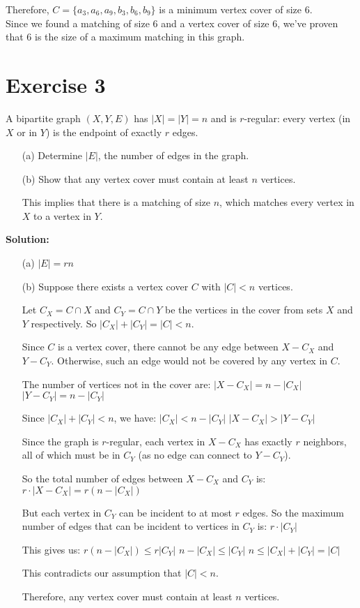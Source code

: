 \documentclass{article}
\begin{document}
Therefore, $C = \{a_3, a_6, a_9, b_3, b_6, b_9\}$ is a minimum vertex cover of size 6. \\

Since we found a matching of size 6 and a vertex cover of size 6, we've proven that 6 is the size of a maximum matching in this graph.

\newpage

\section*{Exercise 3}
A bipartite graph $(X,Y,E)$ has $|X| = |Y| = n$ and is $r$-regular: every vertex (in $X$ or in $Y$) is the endpoint of exactly $r$ edges.

\begin{itemize}
    \item[(a)] Determine $|E|$, the number of edges in the graph.
    \item[(b)] Show that any vertex cover must contain at least $n$ vertices.
    
    This implies that there is a matching of size $n$, which matches every vertex in $X$ to a vertex in $Y$.
\end{itemize}

\textbf{Solution:} \\

\begin{itemize}
    \item[(a)] $|E| = rn$

    \item[(b)] Suppose there exists a vertex cover $C$ with $|C| < n$ vertices.

    Let $C_X = C \cap X$ and $C_Y = C \cap Y$ be the vertices in the cover from sets $X$ and $Y$ respectively.
    So $|C_X| + |C_Y| = |C| < n$.
    
    Since $C$ is a vertex cover, there cannot be any edge between $X - C_X$ and $Y - C_Y$.
    Otherwise, such an edge would not be covered by any vertex in $C$.
    
    The number of vertices not in the cover are:
    $|X - C_X| = n - |C_X|$
    $|Y - C_Y| = n - |C_Y|$
    
    Since $|C_X| + |C_Y| < n$, we have:
    $|C_X| < n - |C_Y|$
    $|X - C_X| > |Y - C_Y|$
    
    Since the graph is $r$-regular, each vertex in $X - C_X$ has exactly $r$ neighbors, all of which must be in $C_Y$ (as no edge can connect to $Y - C_Y$).
    
    So the total number of edges between $X - C_X$ and $C_Y$ is:
    $r \cdot |X - C_X| = r(n - |C_X|)$
    
    But each vertex in $C_Y$ can be incident to at most $r$ edges.
    So the maximum number of edges that can be incident to vertices in $C_Y$ is:
    $r \cdot |C_Y|$
    
    This gives us:
    $r(n - |C_X|) \leq r|C_Y|$
    $n - |C_X| \leq |C_Y|$
    $n \leq |C_X| + |C_Y| = |C|$
    
    This contradicts our assumption that $|C| < n$.
    
    Therefore, any vertex cover must contain at least $n$ vertices.
\end{itemize}
\end{document}
